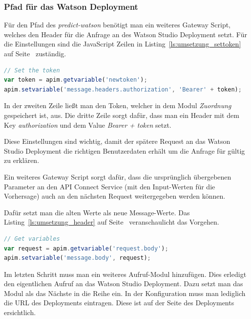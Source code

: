 \subsubsection*{Pfad für das Watson Deployment}
Für den Pfad des \textit{predict-watson} benötigt man ein weiteres Gateway Script, welches den Header für die Anfrage
an des Watson Studio Deployment setzt. Für die Einstellungen sind die JavaScript Zeilen in
Listing~\ref{ls:umsetzung_settoken} auf Seite~\pageref{ls:umsetzung_settoken} zuständig.

\begin{lstlisting}[language=JavaScript, caption=Gateway Script für den Authorization-Token, label=ls:umsetzung_settoken]
// Set the token
var token = apim.getvariable('newtoken');
apim.setvariable('message.headers.authorization', 'Bearer' + token);
\end{lstlisting}

In der zweiten Zeile ließt man den Token, welcher in dem Modul \textit{Zuordnung} gespeichert ist, aus. Die dritte
Zeile sorgt dafür, dass man ein Header mit dem Key \textit{authorization} und dem Value \textit{Bearer + token} setzt.

Diese Einstellungen sind wichtig, damit der spätere Request an das Watson Studio Deployment die richtigen Benutzerdaten
erhält um die Anfrage für gültig zu erklären.

Ein weiteres Gateway Script sorgt dafür, dass die ursprünglich übergebenen Parameter an den API Connect Service (mit den
Input-Werten für die Vorhersage) auch an den nächsten Request weitergegeben werden können.

Dafür setzt man die alten Werte als neue Message-Werte. Das Listing~\ref{ls:umsetzung_header} auf
Seite~\pageref{ls:umsetzung_header} veranschaulicht das Vorgehen.

\begin{lstlisting}[language=JavaScript, caption=Gateway Script zum Setzen des Message-Bodies, label=ls:umsetzung_header]
// Get variables
var request = apim.getvariable('request.body');
apim.setvariable('message.body', request);
\end{lstlisting}

Im letzten Schritt muss man ein weiteres Aufruf-Modul hinzufügen. Dies erledigt den eigentlichen Aufruf an das Watson
Studio Deployment. Dazu setzt man das Modul als das Nächste in die Reihe ein. In der Konfiguration muss man lediglich
die URL des Deployments eintragen. Diese ist auf der Seite des Deployments ersichtlich.

